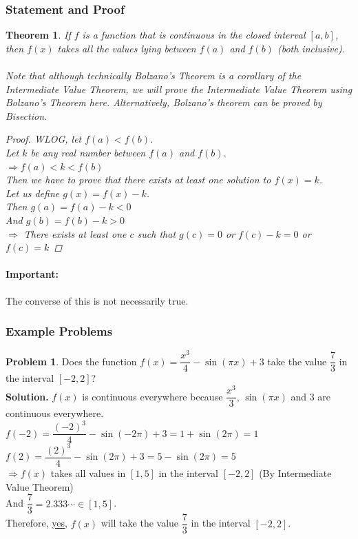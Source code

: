 \documentclass[14]{article}
\newtheorem{theorem}{Theorem}
\theoremstyle{definition}
\newtheorem{prob}{Problem}
\theoremstyle{case}
\begin{document}
\subsubsection{Statement and Proof}
\begin{theorem}
If $f$ is a function that is continuous in the closed interval $[a, b]$, then $f(x)$ takes all the values lying between $f(a)$ and $f(b)$ (both inclusive).\\\\
Note that although technically Bolzano's Theorem is a corollary of the Intermediate Value Theorem, we will prove the Intermediate Value Theorem using Bolzano's Theorem here. Alternatively, Bolzano's theorem can be proved by Bisection.
\begin{proof}
WLOG, let $f(a) < f(b)$.\\
Let $k$ be any real number between $f(a)$ and $f(b)$.\\
$\Rightarrow f(a) < k < f(b)$\\
Then we have to prove that there exists at least one solution to $f(x) = k$.\\
Let us define $g(x) = f(x) - k$.\\
Then $g(a) = f(a) - k < 0$\\
And $g(b) = f(b) - k > 0$\\
$\Rightarrow$ There exists at least one $c$ such that $g(c) = 0$ or $f(c) - k = 0$ or $f(c) = k$
\end{proof}
\end{theorem}
\paragraph{Important:} The converse of this is not necessarily true.
\subsubsection{Example Problems}
\begin{prob}
Does the function $f(x) = \dfrac{x^3}{4} - \sin(\pi x) + 3$ take the value $\dfrac{7}{3}$ in the interval $[-2, 2]$?\\
\textbf{Solution.}
$f(x)$ is continuous everywhere because $\dfrac{x^3}{3}$, $\sin(\pi x)$ and $3$ are continuous everywhere.\\
$f(-2) = \dfrac{(-2)^3}{4} - \sin(-2\pi) + 3 = 1 + \sin(2\pi) = 1$\\
$f(2) = \dfrac{(2)^3}{4} - \sin(2\pi) + 3 = 5 - \sin(2\pi) = 5$\\
$\Rightarrow f(x)$ takes all values in $[1, 5]$ in the interval $[-2, 2]$ (By Intermediate Value Theorem)\\
And $\dfrac{7}{3} = 2.333\cdots \in [1, 5]$.\\
Therefore, \underline{yes}, $f(x)$ will take the value $\dfrac{7}{3}$ in the interval $[-2, 2]$.
\end{prob}
\end{document}
